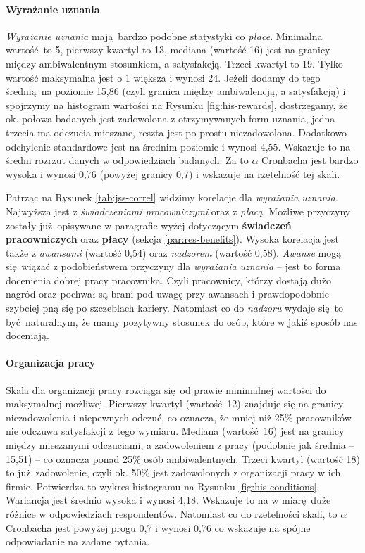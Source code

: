 \paragraph{Wyrażanie uznania} \textit{Wyrażanie uznania} mają bardzo podobne statystyki co \textit{płace}. Minimalna wartość to 5, pierwszy kwartyl to 13, mediana (wartość 16) jest na granicy między ambiwalentnym stosunkiem, a satysfakcją. Trzeci kwartyl to 19. Tylko wartość maksymalna jest o 1 większa i wynosi 24. Jeżeli dodamy do tego średnią na poziomie 15,86 (czyli granica między ambiwalencją, a satysfakcją) i spojrzymy na histogram wartości na Rysunku \ref{fig:his-rewards},
dostrzegamy, że ok. połowa badanych jest zadowolona z otrzymywanych form uznania, jedna-trzecia ma odczucia mieszane, reszta jest po prostu niezadowolona. Dodatkowo odchylenie standardowe jest na średnim poziomie i wynosi 4,55. Wskazuje to na średni rozrzut danych w odpowiedziach badanych. Za to $\alpha$ Cronbacha jest bardzo wysoka i wynosi 0,76 (powyżej granicy 0,7) i wskazuje na rzetelność tej skali.

Patrząc na Rysunek \ref{tab:jss-correl} widzimy korelacje dla \textit{wyrażania uznania}. Najwyższa jest z \textit{świadczeniami pracowniczymi} oraz z \textit{płacą}. Możliwe przyczyny zostały już opisywane w paragrafie wyżej dotyczącym \textbf{świadczeń pracowniczych} oraz \textbf{płacy} (sekcja \ref{par:res-benefits}). Wysoka korelacja jest także z \textit{awansami} (wartość 0,54) oraz \textit{nadzorem} (wartość 0,58). \textit{Awanse} mogą się wiązać z podobieństwem przyczyny dla \textit{wyrażania uznania} -- jest to forma
docenienia dobrej pracy pracownika. Czyli pracownicy, którzy dostają dużo nagród oraz pochwał są brani pod uwagę przy awansach i prawdopodobnie szybciej pną się po szczeblach kariery. Natomiast co do \textit{nadzoru} wydaje się to być naturalnym, że mamy pozytywny stosunek do osób, które w jakiś sposób nas doceniają.

\paragraph{Organizacja pracy} Skala dla organizacji pracy rozciąga się od prawie minimalnej wartości do maksymalnej możliwej. Pierwszy kwartyl (wartość 12) znajduje się na granicy niezadowolenia i niepewnych odczuć, co oznacza, że mniej niż 25\% pracowników nie odczuwa satysfakcji z tego wymiaru. Mediana (wartość 16) jest na granicy między mieszanymi odczuciami, a zadowoleniem z pracy (podobnie jak średnia -- 15,51) -- co oznacza ponad 25\% osób ambiwalentnych. Trzeci kwartyl (wartość 18) to już zadowolenie, czyli ok. 50\% jest zadowolonych z 
organizacji pracy w ich firmie. Potwierdza to wykres histogramu na Rysunku \ref{fig:his-conditions}. Wariancja jest średnio wysoka i wynosi 4,18. Wskazuje to na w miarę duże różnice w odpowiedziach respondentów. Natomiast co do rzetelności skali, to $\alpha$ Cronbacha jest powyżej progu 0,7 i wynosi 0,76 co wskazuje na spójne odpowiadanie na zadane pytania.


